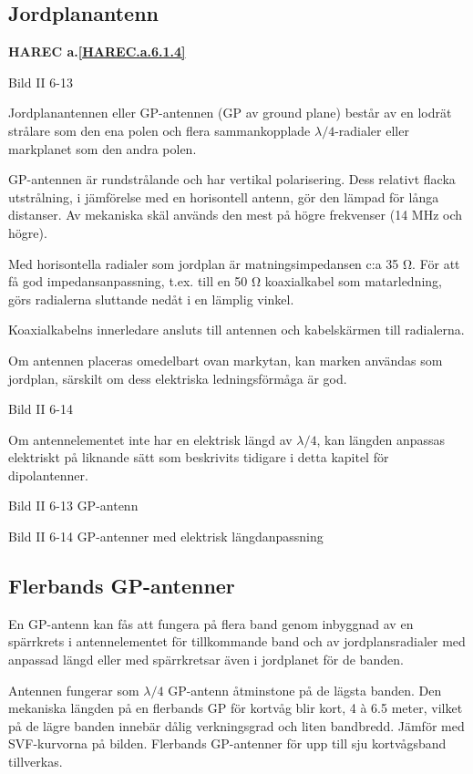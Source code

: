 \subsection{Jordplanantenn}
\textbf{
HAREC a.\ref{HAREC.a.6.1.4}\label{myHAREC.a.6.1.4}
}

Bild II 6-13

Jordplanantennen eller GP-antennen (GP av ground plane) består av en
lodrät strålare som den ena polen och flera sammankopplade
\(\lambda/4\)-radialer eller markplanet som den andra polen.

GP-antennen är rundstrålande och har vertikal polarisering. Dess
relativt flacka utstrålning, i jämförelse med en horisontell antenn,
gör den lämpad för långa distanser.  Av mekaniska skäl används den
mest på högre frekvenser (14 MHz och högre).

Med horisontella radialer som jordplan är matningsimpedansen c:a 35
Ω. För att få god impedansanpassning, t.ex. till en 50 Ω koaxialkabel
som matarledning, görs radialerna sluttande nedåt i en lämplig vinkel.

Koaxialkabelns innerledare ansluts till antennen och kabelskärmen till
radialerna.

Om antennen placeras omedelbart ovan markytan, kan marken användas som
jordplan, särskilt om dess elektriska ledningsförmåga är god.

Bild II 6-14

Om antennelementet inte har en elektrisk längd av \(\lambda/4\), kan
längden anpassas elektriskt på liknande sätt som beskrivits tidigare i
detta kapitel för dipolantenner.

Bild II 6-13 GP-antenn

Bild II 6-14 GP-antenner med elektrisk längdanpassning

\subsection{Flerbands GP-antenner}

En GP-antenn kan fås att fungera på flera band genom inbyggnad av en
spärrkrets i antennelementet för tillkommande band och av
jordplansradialer med anpassad längd eller med spärrkretsar även i
jordplanet för de banden.

Antennen fungerar som \(\lambda/4\) GP-antenn åtminstone på de lägsta
banden. Den mekaniska längden på en flerbands GP för kortvåg blir
kort, 4 à 6.5 meter, vilket på de lägre banden innebär dålig
verkningsgrad och liten bandbredd. Jämför med SVF-kurvorna på
bilden. Flerbands GP-antenner för upp till sju kortvågsband
tillverkas.

